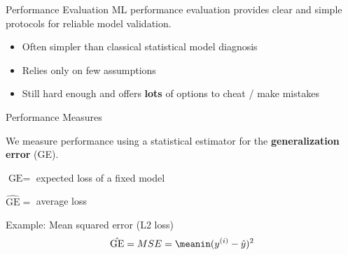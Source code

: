 \begin{vbframe}{Performance Evaluation}
ML performance evaluation provides clear and simple protocols for reliable model
validation. 

\begin{itemize}
\item Often simpler than classical statistical model diagnosis 
\item Relies only on few assumptions
\item Still hard enough and offers \textbf{lots} of options to cheat / make mistakes 
\end{itemize}
\end{vbframe}

\begin{vbframe}{Performance Measures}

We measure performance using a statistical estimator for the 
\textbf{generalization error} (GE).

\lz
$\text{GE} = $ expected loss of a fixed model

\lz
$\hat{\text{GE}} = $ average loss 

\lz \lz

Example: Mean squared error (L2 loss)
\[
\hat{\text{GE}} = MSE = \meanin (\yi - \yih)^2
\]

\end{vbframe}


